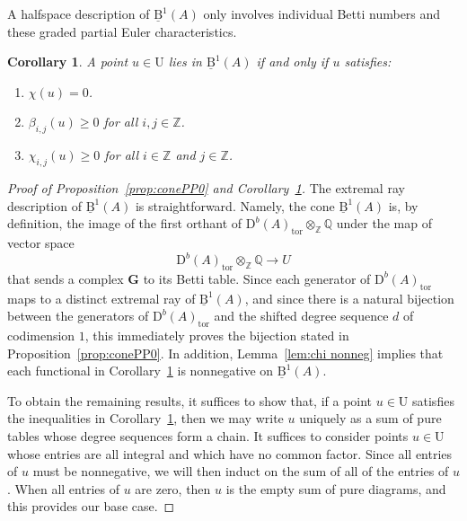 \documentclass[12pt]{amsart}
\newtheorem{cor}[lemma]{Corollary}
\theoremstyle{definition}
\theoremstyle{remark}
\newcommand{\ZZ}{\mathbb{Z}}
\newcommand{\QQ}{\mathbb{Q}}
\newcommand{\UU}{\mathrm{U}}
\newcommand{\Gbull}{\mathbf{G}}
\newcommand{\DD}{\mathrm{D}}
\newcommand{\BBQ}{\underline{\mathrm{B}}}
\begin{document}
A halfspace description of $\BBQ^1(A)$ only involves individual Betti numbers and these graded partial Euler characteristics.

\begin{cor}\label{cor:dualconeA}
A point $u\in \UU$ lies in $\BBQ^1(A)$ if and only if $u$ satisfies:
	\begin{enumerate}
		\item $\chi(u)= 0$.
		\item $\beta_{i,j}(u)\geq 0$ for all $i,j\in \ZZ$.
		\item  $\chi_{i,j}(u)\geq 0$ for all $i\in \ZZ$ and $j\in \ZZ$.
	\end{enumerate}
\end{cor}

\begin{proof}[Proof of Proposition~\ref{prop:conePP0} and Corollary~\ref{cor:dualconeA}]
The extremal ray description of $\BBQ^1(A)$ is straightforward.  Namely, the cone $\BBQ^1(A)$ is, by definition, the image of the first orthant of $\DD^b(A)_{\text{tor}}\otimes_{\ZZ} \QQ$ under the map of vector space
\[
\DD^b(A)_{\text{tor}}\otimes_{\ZZ} \QQ\to U
\]
that sends a complex $\Gbull$ to its Betti table.  Since each generator of $\DD^b(A)_{\text{tor}}$ maps to a distinct extremal ray of $\BBQ^1(A)$, and since there is a natural bijection between the generators of  $\DD^b(A)_{\text{tor}}$ and the shifted degree sequence $d$ of codimension $1$, this immediately proves the bijection stated in Proposition~\ref{prop:conePP0}.
In addition, Lemma~\ref{lem:chi nonneg} implies that each functional in Corollary~\ref{cor:dualconeA} is nonnegative on $\BBQ^1(A)$.  

To obtain the remaining results, it suffices to show that, if a point $u\in \UU$ satisfies the inequalities in Corollary~\ref{cor:dualconeA}, then we may write $u$ uniquely as a sum of pure tables whose degree sequences form a chain.  It suffices to consider points $u\in \UU$ whose entries are all integral and which have no common factor.  Since all entries of $u$ must be nonnegative, we will then induct on the sum of all of the entries of $u$.  When all entries of $u$ are zero, then $u$ is the empty sum of pure diagrams, and this provides our base case.


\end{proof}
\end{document}
